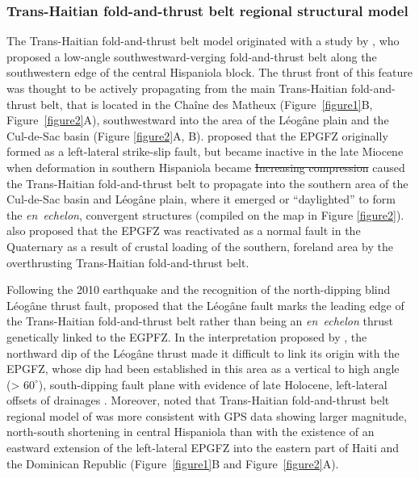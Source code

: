 \documentclass[linenumbers,draft]{agujournal}
\providecommand{\DIFaddtex}[1]{{\protect\color{blue}\uwave{#1}}} %
\providecommand{\DIFdeltex}[1]{{\protect\color{red}\sout{#1}}}                      %
\providecommand{\DIFaddbegin}{} %
\providecommand{\DIFaddend}{} %
\providecommand{\DIFdelbegin}{} %
\providecommand{\DIFdelend}{} %
\providecommand{\DIFadd}[1]{\texorpdfstring{\DIFaddtex{#1}}{#1}} %
\providecommand{\DIFdel}[1]{\texorpdfstring{\DIFdeltex{#1}}{}} %
\begin{document}
\subsubsection{Trans-Haitian fold-and-thrust belt regional structural model}
The Trans-Haitian fold-and-thrust belt model originated with a study by \citet{pubellier2000plate}, who proposed a low-angle southwestward-verging fold-and-thrust belt along the southwestern edge of the central Hispaniola block. The thrust front of this feature was thought to be actively propagating from the main Trans-Haitian fold-and-thrust belt, that is located in the Cha\^ine des Matheux (Figure~\ref{figure1}B, Figure~\ref{figure2}A), southwestward into the area of the L\'eog\^ane plain and the Cul-de-Sac basin (Figure \ref{figure2}A, B). \citet{pubellier2000plate} proposed that the EPGFZ originally formed as a left-lateral strike-slip fault, but became inactive in the late Miocene when deformation in southern Hispaniola became \DIFdelbegin \DIFdel{Increasing compression }\DIFdelend \DIFaddbegin \DIFadd{inactive. Increasing amounts of shortening }\DIFaddend caused the Trans-Haitian fold-and-thrust belt to propagate into the southern area of the Cul-de-Sac basin and L\'eog\^ane plain, where it emerged or ``daylighted'' to form the \textit{en~echelon}, convergent structures (compiled on the map in Figure \ref{figure2}). \citet{pubellier2000plate} also proposed that the EPGFZ was reactivated as a normal fault in the Quaternary as a result of crustal loading of the southern, foreland area by the overthrusting Trans-Haitian fold-and-thrust belt. 

Following the 2010 earthquake and the recognition of the north-dipping blind L\'eog\^ane thrust fault, \citet{calais2010transpressional} proposed that the L\'eog\^ane fault marks the leading edge of the Trans-Haitian fold-and-thrust belt rather than being an \textit{en~echelon} thrust genetically linked to the EGPFZ. In the interpretation proposed by \citet{calais2010transpressional}, the northward dip of the L\'eog\^ane thrust made it difficult to link its origin with the EPGFZ, whose dip had been established in this area as a vertical to high angle (> $60^{\circ}$), south-dipping fault plane with evidence of late Holocene, left-lateral offsets of drainages \citep{prentice2010seismic}. Moreover, \citet{symithe2016present} noted that Trans-Haitian fold-and-thrust belt regional model of \citet{pubellier2000plate} was more consistent with GPS data showing larger magnitude, north-south shortening in central Hispaniola than with the existence of an eastward extension of the left-lateral EPGFZ into the eastern part of Haiti and the Dominican Republic (Figure~\ref{figure1}B and Figure~\ref{figure2}A).
\end{document}
